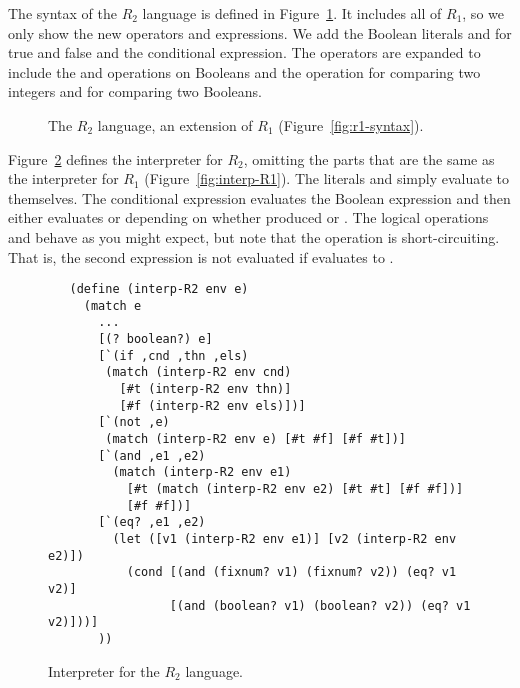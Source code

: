 \documentclass[11pt]{book}
\begin{document}
The syntax of the $R_2$ language is defined in
Figure~\ref{fig:r2-syntax}. It includes all of $R_1$, so we only show
the new operators and expressions. We add the Boolean literals
 and  for true and false and the conditional
expression. The operators are expanded to include the  and
 operations on Booleans and the  operation for
comparing two integers and for comparing two Booleans.

\begin{figure}[tbp]
\centering
{}
\caption{The $R_2$ language, an extension of $R_1$
  (Figure~\ref{fig:r1-syntax}).}
\label{fig:r2-syntax}
\end{figure}

Figure~\ref{fig:interp-R2} defines the interpreter for $R_2$, omitting
the parts that are the same as the interpreter for $R_1$
(Figure~\ref{fig:interp-R1}). The literals  and 
simply evaluate to themselves. The conditional expression  evaluates the Boolean expression  and then
either evaluates  or  depending on whether
 produced  or . The logical operations
 and  behave as you might expect, but note that
the  operation is short-circuiting. That is, the second
expression  is not evaluated if  evaluates to
.

\begin{figure}[tbp]
\begin{lstlisting}
   (define (interp-R2 env e)
     (match e
       ...
       [(? boolean?) e]
       [`(if ,cnd ,thn ,els)
        (match (interp-R2 env cnd)
          [#t (interp-R2 env thn)]
          [#f (interp-R2 env els)])]
       [`(not ,e)
        (match (interp-R2 env e) [#t #f] [#f #t])]
       [`(and ,e1 ,e2)
         (match (interp-R2 env e1)
           [#t (match (interp-R2 env e2) [#t #t] [#f #f])]
           [#f #f])]
       [`(eq? ,e1 ,e2)
         (let ([v1 (interp-R2 env e1)] [v2 (interp-R2 env e2)])
           (cond [(and (fixnum? v1) (fixnum? v2)) (eq? v1 v2)]
                 [(and (boolean? v1) (boolean? v2)) (eq? v1 v2)]))]
       ))
\end{lstlisting}
\caption{Interpreter for the $R_2$ language.}
\label{fig:interp-R2}
\end{figure}
\end{document}
